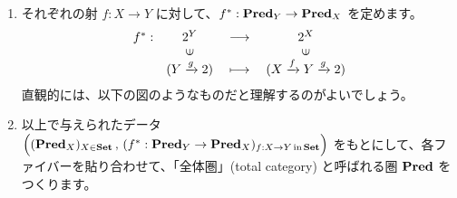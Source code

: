 \documentclass[
		head_space=20mm,
		foot_space=20mm,
		gutter=10mm,
		line_length=190mm
]{jlreq}
\begin{document}
\begin{enumerate}
\begin{center}
		\end{center}
	\item それぞれの射 $f:X\to Y$ に対して、$f^\ast:\mathbf{Pred}_Y\to\mathbf{Pred}_X$ を定めます。
		\[
		\begin{array}{cccc}
			f^\ast:&2^Y&\longrightarrow&2^X\\[0pt]&\rotatebox{90}{$\in$}&&\rotatebox{90}{$\in$}\\[-2pt]&(Y\xrightarrow{g} 2)&{\;\longmapsto\;}&(X\xrightarrow{f}Y\xrightarrow{g} 2)
		\end{array}
		\] 
		直観的には、以下の図のようなものだと理解するのがよいでしょう。
		\begin{center}
		\end{center}
	\item 以上で与えられたデータ $\Bigl((\mathbf{Pred}_X)_{X\in\mathbf{Set}}\,,\,(f^\ast:\mathbf{Pred}_Y\to\mathbf{Pred}_X)_{f:X\to Y\,\textrm{in}\,\mathbf{Set}}\Bigr)$ をもとにして、各ファイバーを貼り合わせて、「全体圏」(total category) と呼ばれる圏 $\mathbf{Pred}$ をつくります。
	\begin{small}
		\begin{center}

\end{center}
\end{small}
\end{enumerate}
\end{document}
